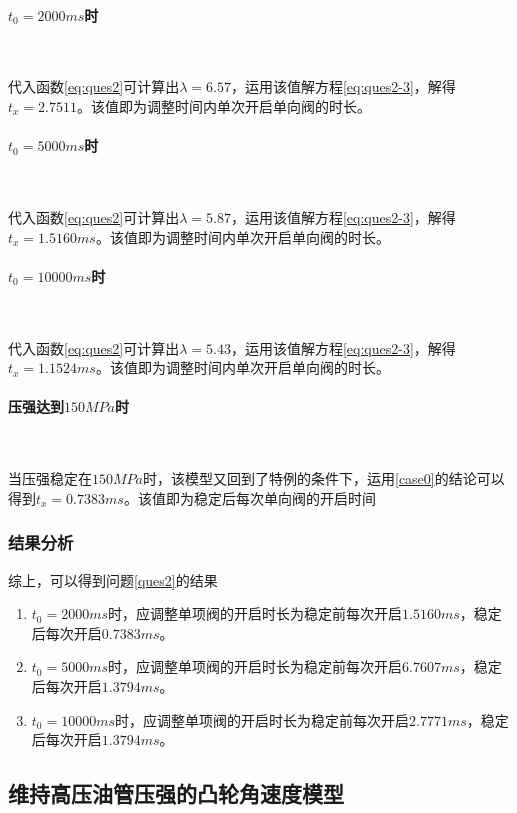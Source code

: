 \documentclass[withoutpreface,bwprint]{cumcmthesis} %
\begin{document}
\paragraph{$t_{0}=2000ms$时}~{}

代入函数\cref{eq:ques2}可计算出$\lambda=6.57$，运用该值解方程\cref{eq:ques2-3}，解得$t_{x} =2.7511$。该值即为调整时间内单次开启单向阀的时长。

\paragraph{$t_{0}=5000ms$时}~{}

代入函数\cref{eq:ques2}可计算出$\lambda=5.87$，运用该值解方程\cref{eq:ques2-3}，解得$t_{x} = 1.5160ms$。该值即为调整时间内单次开启单向阀的时长。
\paragraph{$t_{0}=10000ms$时}~{}

代入函数\cref{eq:ques2}可计算出$\lambda=5.43$，运用该值解方程\cref{eq:ques2-3}，解得$t_{x} = 1.1524ms$。该值即为调整时间内单次开启单向阀的时长。

\paragraph{压强达到$150MPa$时}~{}

当压强稳定在$150MPa$时，该模型又回到了特例的条件下，运用\ref{case0}的结论可以得到$t_{x} = 0.7383ms$。该值即为稳定后每次单向阀的开启时间

\subsubsection{结果分析}

综上，可以得到问题\ref{ques2}的结果
\begin{enumerate}
	\item $t_{0}=2000ms$时，应调整单项阀的开启时长为稳定前每次开启$1.5160ms$，稳定后每次开启$ 0.7383ms$。
	\item $t_{0}=5000ms$时，应调整单项阀的开启时长为稳定前每次开启$6.7607ms$，稳定后每次开启$1.3794ms$。
	\item$t_{0}=10000ms$时，应调整单项阀的开启时长为稳定前每次开启$2.7771ms$，稳定后每次开启$1.3794ms$。
\end{enumerate}
\subsection{维持高压油管压强的凸轮角速度模型}\label{model2}
\end{document}
